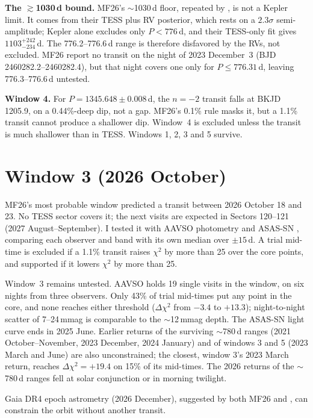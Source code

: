 \documentclass{aastex701}
\begin{document}
\textbf{The $\gtrsim$1030\,d bound.} MF26's $\sim$1030\,d floor, repeated by \citet{Zhu2026}, is not a Kepler
limit. It comes from their TESS plus RV posterior, which rests on a $2.3\sigma$ semi-amplitude; Kepler alone
excludes only $P<776$\,d, and their TESS-only fit gives $1103^{+242}_{-234}$\,d. The 776.2--776.6\,d range is
therefore disfavored by the RVs, not excluded. MF26 report no transit on the night of 2023 December~3 (BJD
2460282.2--2460282.4), but that night covers one only for $P\leq776.31$\,d, leaving 776.3--776.6\,d untested.

\textbf{Window 4.} For $P=1345.648\pm0.008$\,d, the $n=-2$ transit falls at BKJD 1205.9, on a 0.44\%-deep dip,
not a gap. MF26's 0.1\% rule masks it, but a 1.1\% transit cannot produce a shallower dip. Window~4 is excluded
unless the transit is much shallower than in TESS. Windows 1, 2, 3 and 5 survive.

\section{Window 3 (2026 October)}

MF26's most probable window predicted a transit between 2026 October 18 and 23. No TESS sector covers it; the
next visits are expected in Sectors 120--121 (2027 August--September). I tested it with AAVSO photometry
\citep[22,234 observations from 2021 July to 2026 October 29 after cuts;][]{AAVSO} and ASAS-SN
\citep{Kochanek2017,Hart2023}, comparing each observer and band with its own median over $\pm15$\,d. A trial
mid-time is excluded if a 1.1\% transit raises $\chi^2$ by more than 25 over the core points, and supported if it
lowers $\chi^2$ by more than 25.

Window~3 remains untested. AAVSO holds 19 single visits in the window, on six nights from three observers. Only
43\% of trial mid-times put any point in the core, and none reaches either threshold ($\Delta\chi^2$ from $-3.4$
to $+13.3$); night-to-night scatter of 7--24\,mmag is comparable to the $\sim$12\,mmag depth. The ASAS-SN light
curve ends in 2025 June. Earlier returns of the surviving $\sim$780\,d ranges (2021 October--November, 2023
December, 2024 January) and of windows 3 and 5 (2023 March and June) are also unconstrained; the closest, window
3's 2023 March return, reaches $\Delta\chi^2=+19.4$ on 15\% of its mid-times. The 2026 returns of the $\sim$780\,d
ranges fell at solar conjunction or in morning twilight.

Gaia DR4 epoch astrometry (2026 December), suggested by both MF26 and \citet{Zhu2026}, can constrain the orbit
without another transit.
\end{document}
